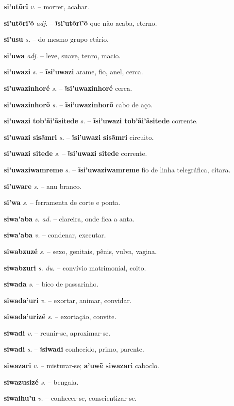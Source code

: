 \textbf{si'utõrĩ} \textit{v.} -- morrer, acabar.

\textbf{si'utõri'õ} \textit{adj.} -- \textbf{ĩsi'utõrĩ'õ} que não acaba, eterno.

\textbf{si'usu} \textit{s.} -- do mesmo grupo etário.

\textbf{si'uwa} \textit{adj.} -- leve, suave, tenro, macio.

\textbf{si'uwazi} \textit{s.} -- \textbf{ĩsi'uwazi} arame, fio, anel, cerca.

\textbf{si'uwazinhoré} \textit{s.} -- \textbf{ĩsi'uwazinhoré} cerca.

\textbf{si'uwazinhorõ} \textit{s.} -- \textbf{ĩsi'uwazinhorõ} cabo de aço.

\textbf{si'uwazi tob'ãi'ãsitede} \textit{s.} -- \textbf{ĩsi'uwazi tob'ãi'ãsitede} corrente.

\textbf{si'uwazi sisãmri} \textit{s.} -- \textbf{ĩsi'uwazi sisãmri} circuito.

\textbf{si'uwazi sitede} \textit{s.} -- \textbf{ĩsi'uwazi sitede} corrente.

\textbf{si'uwaziwamreme} \textit{s.} -- \textbf{ĩsi'uwaziwamreme} fio de linha telegráfica, cítara.

\textbf{si'uware} \textit{s.} -- anu branco.

\textbf{si'wa} \textit{s.} -- ferramenta de corte e ponta.

\textbf{siwa'aba} \textit{s. ad.} -- clareira, onde fica a anta.

\textbf{siwa'aba} \textit{v.} -- condenar, executar.

\textbf{siwabzuzé} \textit{s.} -- sexo, genitais, pênis, vulva, vagina.

\textbf{siwabzuri} \textit{s. du.} -- convívio matrimonial, coito.

\textbf{siwada} \textit{s.} -- bico de passarinho.

\textbf{siwada'uri} \textit{v.} -- exortar, animar, convidar.

\textbf{siwada'urizé} \textit{s.} -- exortação, convite.

\textbf{siwadi} \textit{v.} -- reunir-se, aproximar-se.

\textbf{siwadi} \textit{s.} -- \textbf{ĩsiwadi} conhecido, primo, parente.

\textbf{siwazari} \textit{v.} -- misturar-se; \textbf{a'uwẽ siwazari} caboclo.

\textbf{siwazusizé} \textit{s.} -- bengala.

\textbf{siwaihu'u} \textit{v.} -- conhecer-se, conscientizar-se.

